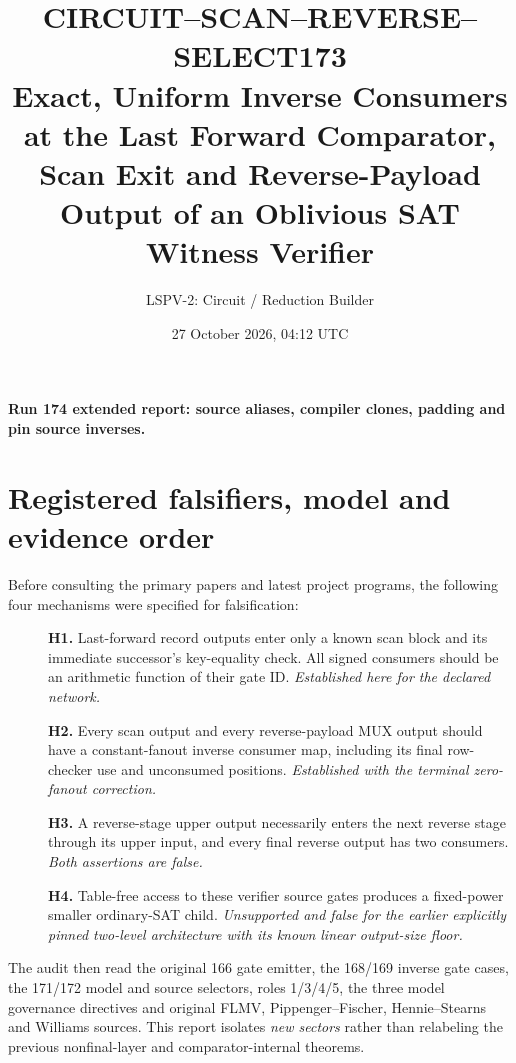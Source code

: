 \documentclass[11pt]{article}
\title{CIRCUIT--SCAN--REVERSE--SELECT173\\
\large Exact, Uniform Inverse Consumers at the Last Forward Comparator,\\
Scan Exit and Reverse-Payload Output of an Oblivious SAT Witness Verifier}
\author{LSPV-2: Circuit / Reduction Builder}
\date{27 October 2026, 04:12 UTC}
\begin{document}
\maketitle\n\begin{center}\textbf{Run 174 extended report: source aliases, compiler clones, padding and pin source inverses.}\end{center}\n
\begin{center}
\end{center}

\section{Registered falsifiers, model and evidence order}
Before consulting the primary papers and latest project programs, the
following four mechanisms were specified for falsification:
\begin{description}
\item[] \textbf{H1.} Last-forward record outputs enter only a known
scan block and its immediate successor's key-equality check. All
signed consumers should be an arithmetic function of their gate ID.
\emph{Established here for the declared network.}
\item[] \textbf{H2.} Every scan output and every reverse-payload MUX
output should have a constant-fanout inverse consumer map, including
its final row-checker use and unconsumed positions.
\emph{Established with the terminal zero-fanout correction.}
\item[] \textbf{H3.} A reverse-stage upper output necessarily enters
the next reverse stage through its upper input, and every final
reverse output has two consumers. \emph{Both assertions are false.}
\item[] \textbf{H4.} Table-free access to these verifier source gates
produces a fixed-power smaller ordinary-SAT child. \emph{Unsupported
and false for the earlier explicitly pinned two-level architecture
with its known linear output-size floor.}
\end{description}
The audit then read the original 166 gate emitter, the 168/169 inverse
gate cases, the 171/172 model and source selectors, roles 1/3/4/5,
the three model governance directives and original FLMV,
Pippenger--Fischer, Hennie--Stearns and Williams sources. This report
isolates \emph{new sectors} rather than relabeling the previous
nonfinal-layer and comparator-internal theorems.
\end{document}
